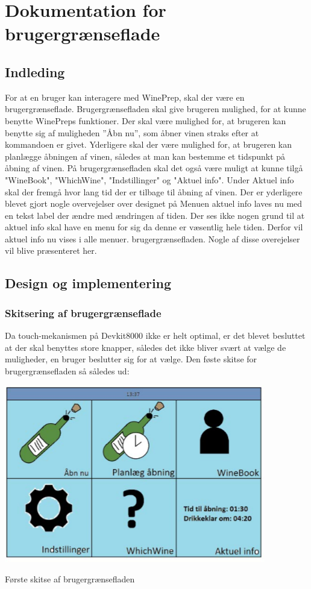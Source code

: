 \chapter*{Dokumentation for brugergrænseflade}

\section*{Indleding}

For at en bruger kan interagere med WinePrep, skal der være en brugergrænseflade. Brugergrænsefladen skal give brugeren mulighed, for at kunne benytte WinePreps funktioner. Der skal være mulighed for, at brugeren kan benytte sig af muligheden ”Åbn nu”, som åbner vinen straks efter at kommandoen er givet. Yderligere skal der være mulighed for, at brugeren kan planlægge åbningen af vinen, således at man kan bestemme et tidspunkt på åbning af vinen. På brugergrænsefladen skal det også være muligt at kunne tilgå "WineBook", "WhichWine", "Indstillinger" og "Aktuel info". Under Aktuel info skal der fremgå hvor lang tid der er tilbage til åbning af vinen. Der er yderligere blevet gjort nogle overvejelser over designet på
Menuen aktuel info laves nu med en tekst label der ændre med ændringen af tiden. Der ses ikke nogen grund til at aktuel info skal have en menu for sig da denne er væsentlig hele tiden. Derfor vil aktuel info nu vises i alle menuer. brugergrænsefladen. Nogle af disse overejelser vil blive præsenteret her. 

\section*{Design og implementering}
\subsection*{Skitsering af brugergrænseflade}

Da touch-mekanismen på Devkit8000 ikke er helt optimal, er det blevet besluttet at der skal benyttes store knapper, således det ikke bliver svært at vælge de muligheder, en bruger beslutter sig for at vælge. Den føste skitse for brugergrænsefladen så således ud:

\includegraphics{Billeder/skitse}
\caption{Første skitse af brugergrænsefladen}

